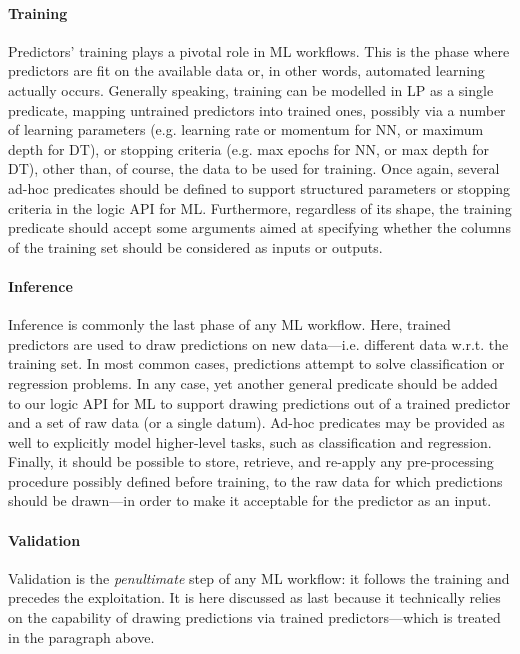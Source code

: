 \documentclass[
]{ceurart}
\begin{document}
\paragraph{Training}
%
Predictors' training plays a pivotal role in ML workflows.
%
This is the phase where predictors are fit on the available data or, in other words, automated learning actually occurs.
%
Generally speaking, training can be modelled in LP as a single predicate, mapping untrained predictors into trained ones, possibly via a number of learning parameters (e.g. learning rate or momentum for NN, or maximum depth for DT), or stopping criteria (e.g. max epochs for NN, or max depth for DT), other than, of course, the data to be used for training.
%
Once again, several ad-hoc predicates should be defined to support structured parameters or stopping criteria in the logic API for ML.
%
Furthermore, regardless of its shape, the training predicate should accept some arguments aimed at specifying whether the columns of the training set should be considered as inputs or outputs.

\paragraph{Inference}
%
Inference is commonly the last phase of any ML workflow.
%
Here, trained predictors are used to draw predictions on new data---i.e. different data w.r.t. the training set.
%
%
In most common cases, predictions attempt to solve classification or regression problems.
%
In any case, yet another general predicate should be added to our logic API for ML to support drawing predictions out of a trained predictor and a set of raw data (or a single datum).
%
Ad-hoc predicates may be provided as well to explicitly model higher-level tasks, such as classification and regression.
%
Finally, it should be possible to store, retrieve, and re-apply any pre-processing procedure possibly defined before training, to the raw data for which predictions should be drawn---in order to make it acceptable for the predictor as an input.

\paragraph{Validation}
%
Validation is the \emph{penultimate} step of any ML workflow: it follows the training and precedes the exploitation.
%
It is here discussed as last because it technically relies on the capability of drawing predictions via trained predictors---which is treated in the paragraph above.
\end{document}

